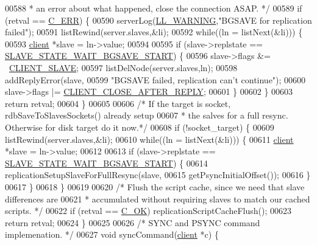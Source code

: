 \begin{DoxyCode}
{{{{{{{{{{{{{{{{{{{{{{{{{{{{{00588 \textcolor{comment}{     * an error about what happened, close the connection ASAP. */}
00589     \textcolor{keywordflow}{if} (retval == \hyperlink{server_8h_af98ac28d5f4d23d7ed5985188e6fb7d1}{C\_ERR}) \{
00590         serverLog(\hyperlink{server_8h_a31229b9334bba7d6be2a72970967a14b}{LL\_WARNING},\textcolor{stringliteral}{"BGSAVE for replication failed"});
00591         listRewind(server.slaves,&li);
00592         \textcolor{keywordflow}{while}((ln = listNext(&li))) \{
00593             \hyperlink{structclient}{client} *slave = ln->value;
00594 
00595             \textcolor{keywordflow}{if} (slave->replstate == \hyperlink{server_8h_a170ee2dd8cfefaf0d112edcc3152f8d7}{SLAVE\_STATE\_WAIT\_BGSAVE\_START}) \{
00596                 slave->flags &= ~\hyperlink{server_8h_ae9f6995948253652bc9454d79a72f4a7}{CLIENT\_SLAVE};
00597                 listDelNode(server.slaves,ln);
00598                 addReplyError(slave,
00599                     \textcolor{stringliteral}{"BGSAVE failed, replication can't continue"});
00600                 slave->flags |= \hyperlink{server_8h_a8cff2154afcc2e87ac85bdbbe2814091}{CLIENT\_CLOSE\_AFTER\_REPLY};
00601             \}
00602         \}
00603         \textcolor{keywordflow}{return} retval;
00604     \}
00605 
00606     \textcolor{comment}{/* If the target is socket, rdbSaveToSlavesSockets() already setup}
00607 \textcolor{comment}{     * the salves for a full resync. Otherwise for disk target do it now.*/}
00608     \textcolor{keywordflow}{if} (!socket\_target) \{
00609         listRewind(server.slaves,&li);
00610         \textcolor{keywordflow}{while}((ln = listNext(&li))) \{
00611             \hyperlink{structclient}{client} *slave = ln->value;
00612 
00613             \textcolor{keywordflow}{if} (slave->replstate == \hyperlink{server_8h_a170ee2dd8cfefaf0d112edcc3152f8d7}{SLAVE\_STATE\_WAIT\_BGSAVE\_START}) \{
00614                     replicationSetupSlaveForFullResync(slave,
00615                             getPsyncInitialOffset());
00616             \}
00617         \}
00618     \}
00619 
00620     \textcolor{comment}{/* Flush the script cache, since we need that slave differences are}
00621 \textcolor{comment}{     * accumulated without requiring slaves to match our cached scripts. */}
00622     \textcolor{keywordflow}{if} (retval == \hyperlink{server_8h_a303769ef1065076e68731584e758d3e1}{C\_OK}) replicationScriptCacheFlush();
00623     \textcolor{keywordflow}{return} retval;
00624 \}
00625 
00626 \textcolor{comment}{/* SYNC and PSYNC command implemenation. */}
00627 \textcolor{keywordtype}{void} syncCommand(\hyperlink{structclient}{client} *c) \{
}}}}}}}}}}}}}}}}}}}}}}}}}}}}}
\end{DoxyCode}
